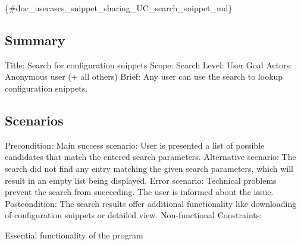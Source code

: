 \{\#doc\+\_\+usecases\+\_\+snippet\+\_\+sharing\+\_\+\+U\+C\+\_\+search\+\_\+snippet\+\_\+md\}

\subsection*{Summary}

Title\+: Search for configuration snippets Scope\+: Search Level\+: User Goal Actors\+: Anonymous user (+ all others) Brief\+: Any user can use the search to lookup configuration snippets.

\subsection*{Scenarios}

Precondition\+: Main success scenario\+: User is presented a list of possible candidates that match the entered search parameters. Alternative scenario\+: The search did not find any entry matching the given search parameters, which will result in an empty list being displayed. Error scenario\+: Technical problems prevent the search from succeeding. The user is informed about the issue. Postcondition\+: The search results offer additional functionality like downloading of configuration snippets or detailed view. Non-\/functional Constraints\+:
\begin{DoxyItemize}
\item Essential functionality of the program 
\end{DoxyItemize}